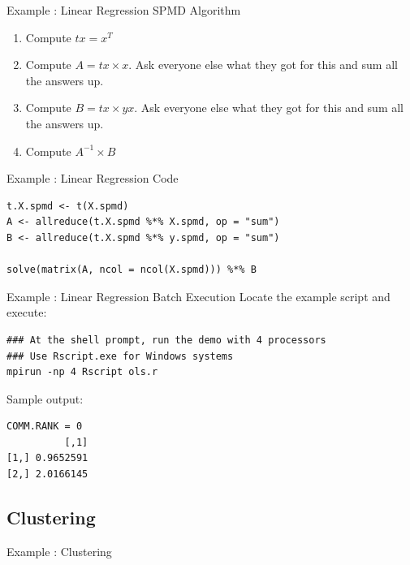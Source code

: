 \begin{frame}
  \begin{block}{Example \showex :  Linear Regression SPMD Algorithm}\pause
    \begin{enumerate}
     \item Compute $tx = x^T$
     \item Compute $A = tx \times x$.  Ask everyone else what they got for this and sum all the answers up.
     \item Compute $B = tx \times yx$.  Ask everyone else what they got for this and sum all the answers up.
     \item Compute $A^{-1}\times B$
    \end{enumerate}
  \end{block}
\end{frame}


\begin{frame}[fragile]
  \begin{exampleblock}{Example \showex :  Linear Regression Code}\pause
\begin{lstlisting}
t.X.spmd <- t(X.spmd)
A <- allreduce(t.X.spmd %*% X.spmd, op = "sum")
B <- allreduce(t.X.spmd %*% y.spmd, op = "sum")

solve(matrix(A, ncol = ncol(X.spmd))) %*% B
\end{lstlisting}
  \end{exampleblock}
\end{frame}

\begin{frame}[fragile]
  \begin{exampleblock}{Example \showex :  Linear Regression Batch Execution}\pause
  Locate the  example script  and execute:
\vspace{-.4cm}
  \begin{lstlisting}[language=Sh]
### At the shell prompt, run the demo with 4 processors
### Use Rscript.exe for Windows systems
mpirun -np 4 Rscript ols.r
\end{lstlisting}
Sample output:\vspace{-.4cm}
\begin{lstlisting}[language=Sh]
COMM.RANK = 0
          [,1]
[1,] 0.9652591
[2,] 2.0166145
\end{lstlisting}
  \end{exampleblock}
\end{frame}




\subsection{Clustering}


\begin{frame}
  \begin{block}{Example \countex :  Clustering}\pause
      
  \end{block}
\end{frame}